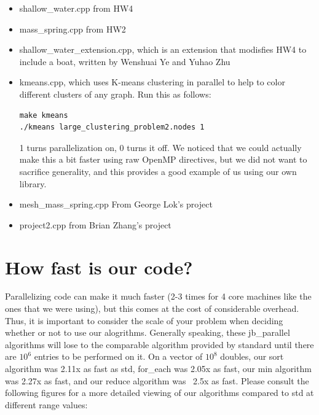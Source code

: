 \documentclass{article}
\begin{document}
\begin{itemize}
\item shallow\_water.cpp from HW4
\item mass\_spring.cpp from HW2
\item shallow\_water\_extension.cpp, which is an extension that modisfies HW4 to include a boat, written by Wenshuai Ye and Yuhao Zhu
\item kmeans.cpp, which uses K-means clustering in parallel to help to color different clusters of any graph.  Run this as follows:
\begin{verbatim}
make kmeans
./kmeans large_clustering_problem2.nodes 1
\end{verbatim}
1 turns parallelization on, 0 turns it off.  We noticed that we could actually make this a bit faster using raw OpenMP directives, but we did not want to sacrifice generality, and this provides a good example of us using our own library.
\item mesh\_mass\_spring.cpp From George Lok's project
\item project2.cpp from Brian Zhang's project
\end{itemize}

\section{How fast is our code?}
Parallelizing code can make it much faster (2-3 times for 4 core machines like the ones that we were using), but this comes at the cost of considerable overhead. Thus, it is important to consider the scale of your problem when deciding whether or not to use our alogrithms. Generally speaking, these jb\_parallel algorithms will lose to the comparable algorithm provided by standard until there are $10^6$ entries to be performed on it. On a vector of $10^8$ doubles, our sort algorithm was 2.11x as fast as std, for\_each was 2.05x as fast, our min algorithm was 2.27x as fast, and our reduce algorithm was  ~2.5x as fast. Please consult the following figures for a more detailed viewing of our algorithms compared to std at different range values:

\end{document}
